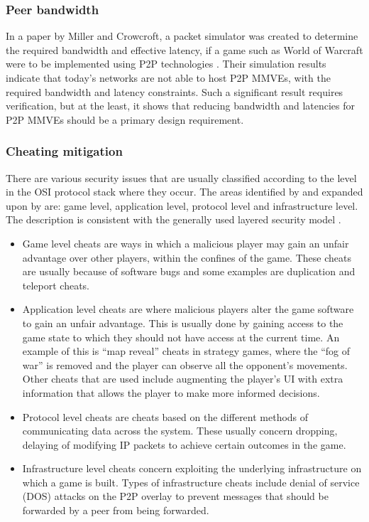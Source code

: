 \subsubsection{Peer bandwidth}
\label{peer_bandwidth_usage}

In a paper by Miller and Crowcroft, a packet simulator was created to determine the required bandwidth and effective latency, if a game such as World of Warcraft were to be implemented using P2P technologies \cite{Miller_p2p_infeasability}. Their simulation results indicate that today's networks are not able to host P2P MMVEs, with the required bandwidth and latency constraints. Such a significant result requires verification, but at the least, it shows that reducing bandwidth and latencies for P2P MMVEs should be a primary design requirement.

\subsubsection{Cheating mitigation}
\label{key_challenges_cheating}

There are various security issues that are usually classified according to the level in the OSI protocol stack where they occur. The areas identified by \cite{cheat_proof_event_ordering} and expanded upon by \cite{cheating_taxonomy} are: game level, application level, protocol level and infrastructure level. The description is consistent with the generally used layered security model \cite{distributed_systems_security}.

\begin{itemize}
\item Game level cheats are ways in which a malicious player may gain an unfair advantage over other players, within the confines of the game. These cheats are usually because of software bugs and some examples are duplication and teleport cheats.

\item Application level cheats are where malicious players alter the game software to gain an unfair advantage. This is usually done by gaining access to the game state to which they should not have access at the current time. An example of this is ``map reveal'' cheats in strategy games, where the ``fog of war'' is removed and the player can observe all the opponent's movements. Other cheats that are used include augmenting the player's UI with extra information that allows the player to make more informed decisions.

\item Protocol level cheats are cheats based on the different methods of communicating data across the system. These usually concern dropping, delaying of modifying IP packets to achieve certain outcomes in the game.

\item Infrastructure level cheats concern exploiting the underlying infrastructure on which a game is built. Types of infrastructure cheats include denial of service (DOS) attacks on the P2P overlay to prevent messages that should be forwarded by a peer from being forwarded.
\end{itemize}

